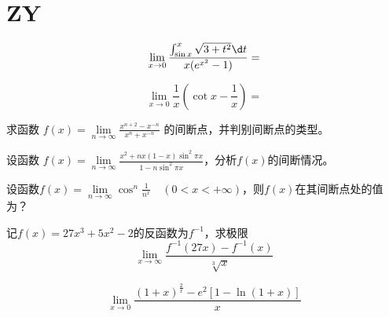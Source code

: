 \section{ZY}
\begin{question}
    \begin{equation}
        \nonumber
        \lim\limits_{ x \to 0 } \frac{ \int_{\sin x}^{x} \sqrt{ 3 + t^2 } \d t }{ x ( e^{x^2} - 1 ) } = 
    \end{equation}
\end{question}

\begin{question}
    \begin{equation}
        \nonumber
        \lim\limits_{ x \to 0 } \frac{1}{x} ( \cot x - \frac{1}{x} ) = 
    \end{equation}
\end{question}

\begin{question}
    求函数 $ f(x) = \lim\limits_{ n \to \infty } \frac{ x^{ n + 2 } - x^{ -n } }{ x^n + x^{ -n } } $ 的间断点，并判别间断点的类型。
\end{question}

\begin{question}
    设函数 $ f(x) = \lim\limits_{ n \to \infty } \frac{ x^2 + nx( 1 - x ) \sin ^2 \pi x }{ 1 - n \sin^2 \pi x } $，分析$ f(x) $的间断情况。 
\end{question}

\begin{question}
    设函数$ f(x) =\lim\limits_{ n \to \infty } \cos^n \frac{ 1 }{ n^x } \quad (0 < x < + \infty) $，则$ f(x) $在其间断点处的值为？
\end{question}

\begin{question}
    记$ f(x) = 27x^3 + 5x^2 - 2 $的反函数为$ f^{-1} $，求极限
    \begin{equation}
        \nonumber
        \lim\limits_{ x \to \infty } \frac{ f^{-1} (27x) - f^{-1} (x) }{ \sqrt[3]{x} }
    \end{equation}
\end{question}

\begin{question}
    \begin{equation}
        \nonumber
        \lim\limits_{x \to 0} \frac{ (1 + x) ^ \frac{2}{x} - e^2 [1 - \ln(1 + x)] }{x}
    \end{equation}
\end{question}

